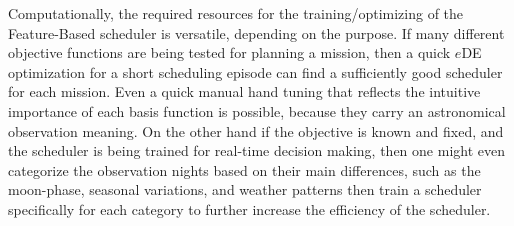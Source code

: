 \documentclass[12pt]{aastex62}
\theoremstyle{definition}
\begin{document}
Computationally, the required resources for the training/optimizing of the Feature-Based scheduler is versatile, depending on the purpose. If many different objective functions are being tested for planning a mission, then a quick $e$DE optimization for a short scheduling episode can find a sufficiently good scheduler for each mission. Even a quick manual hand tuning that reflects the intuitive importance of each basis function is possible, because they carry an astronomical observation meaning. On the other hand if the objective is known and fixed, and the scheduler is being trained for real-time decision making, then one might even categorize the observation nights based on their main differences, such as the moon-phase, seasonal variations, and weather patterns then train a scheduler specifically for each category to further increase the efficiency of the scheduler. 

\appendix
\end{document}
